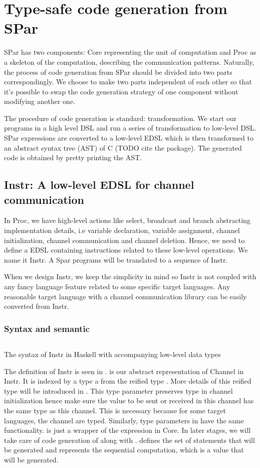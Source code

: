 \chapter{Type-safe code generation from SPar}
SPar has two components: Core representing the unit of computation and Proc as a skeleton of the computation, describing the communication patterns. Naturally, the process of code generation from SPar should be divided into two parts correspondingly. We choose to make two parts independent of each other so that it's possible to swap the code generation strategy of one component without modifying another one.

The procedure of code generation is standard: transformation. We start our programs in a high level DSL and run a series of transformation to low-level DSL. SPar expressions are converted to a low-level EDSL which is then transformed to an abstract syntax tree (AST) of C (TODO cite the package). The generated code is obtained by pretty printing the AST.
\section{Instr: A low-level EDSL for channel communication}
In Proc, we have high-level actions like select, broadcast and branch abstracting implementation details, i.e variable declaration, variable assignment, channel initialization, channel communication and channel deletion. Hence, we need to define a EDSL containing instructions related to these low-level operations. We name it Instr. A Spar programs will be translated to a sequence of Instr. 

When we design Instr, we keep the simplicity in mind so Instr is not coupled with any fancy language feature related to some specific target languages. Any reasonable target language with a channel communication library can be easily converted from Instr.
\subsection{Syntax and semantic}
\begin{listing}
    \inputminted{Haskell}{codegen/instr.hs} 
    \caption{The syntax of Instr in Haskell with accompanying low-level data types}
    \label{codegen:code:instr}
\end{listing}
The definition of Instr is seen in .  is our abstract representation of Channel in Instr. It is indexed by a type a from the reified type . More details of this reified type will be introduced in . This type parameter preserves type in channel initialization hence make sure the value to be sent or received in this channel has the same type as this channel. This is necessary because for some target languages, the channel are typed. Similarly, type parameters in  have the same functionality.  is just a wrapper of the expression in Core. In later stages, we will take care of code generation of  along with .  defines the set of statements that will be generated and  represents the sequential computation, which is a value that will be generated.


